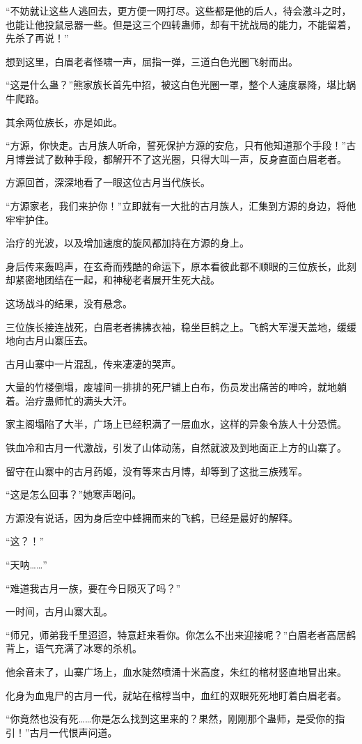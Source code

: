 \begin{this_body}
“不妨就让这些人逃回去，更方便一网打尽。这些都是他的后人，待会激斗之时，也能让他投鼠忌器一些。但是这三个四转蛊师，却有干扰战局的能力，不能留着，先杀了再说！”

想到这里，白眉老者怪啸一声，屈指一弹，三道白色光圈飞射而出。

“这是什么蛊？”熊家族长首先中招，被这白色光圈一罩，整个人速度暴降，堪比蜗牛爬路。

其余两位族长，亦是如此。

“方源，你快走。古月族人听命，誓死保护方源的安危，只有他知道那个手段！”古月博尝试了数种手段，都解开不了这光圈，只得大叫一声，反身直面白眉老者。

方源回首，深深地看了一眼这位古月当代族长。

“方源家老，我们来护你！”立即就有一大批的古月族人，汇集到方源的身边，将他牢牢护住。

治疗的光波，以及增加速度的旋风都加持在方源的身上。

身后传来轰鸣声，在玄奇而残酷的命运下，原本看彼此都不顺眼的三位族长，此刻却紧密地团结在一起，和神秘老者展开生死大战。

这场战斗的结果，没有悬念。

三位族长接连战死，白眉老者拂拂衣袖，稳坐巨鹤之上。飞鹤大军漫天盖地，缓缓地向古月山寨压去。

古月山寨中一片混乱，传来凄凄的哭声。

大量的竹楼倒塌，废墟间一排排的死尸铺上白布，伤员发出痛苦的呻吟，就地躺着。治疗蛊师忙的满头大汗。

家主阁塌陷了大半，广场上已经积满了一层血水，这样的异象令族人十分恐慌。

铁血冷和古月一代激战，引发了山体动荡，自然就波及到地面正上方的山寨了。

留守在山寨中的古月药姬，没有等来古月博，却等到了这批三族残军。

“这是怎么回事？”她寒声喝问。

方源没有说话，因为身后空中蜂拥而来的飞鹤，已经是最好的解释。

“这？！”

“天呐……”

“难道我古月一族，要在今日陨灭了吗？”

一时间，古月山寨大乱。

“师兄，师弟我千里迢迢，特意赶来看你。你怎么不出来迎接呢？”白眉老者高居鹤背上，语气充满了冰寒的杀机。

他余音未了，山寨广场上，血水陡然喷涌十米高度，朱红的棺材竖直地冒出来。

化身为血鬼尸的古月一代，就站在棺椁当中，血红的双眼死死地盯着白眉老者。

“你竟然也没有死……你是怎么找到这里来的？果然，刚刚那个蛊师，是受你的指引！”古月一代恨声问道。

\end{this_body}

